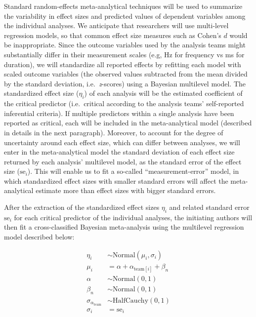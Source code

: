\documentclass[
  english,
  man]{apa6}
\begin{document}
Standard random-effects meta-analytical techniques will be used to summarize the variability in effect sizes and predicted values of dependent variables among the individual analyses.
We anticipate that researchers will use multi-level regression models, so that common effect size measures such as Cohen's \(d\) would be inappropriate.
Since the outcome variables used by the analysis teams might substantially differ in their measurement scales (e.g, Hz for frequency vs ms for duration), we will standardize all reported effects by refitting each model with scaled outcome variables (the observed values subtracted from the mean divided by the standard deviation, i.e.~\emph{z}-scores) using a Bayesian multilevel model.
The standardized effect size (\(\eta_i\)) of each analysis will be the estimated coefficient of the critical predictor (i.e.~critical according to the analysis teams' self-reported inferential criteria).
If multiple predictors within a single analysis have been reported as critical, each will be included in the meta-analytical model (described in details in the next paragraph).
Moreover, to account for the degree of uncertainty around each effect size, which can differ between analyses, we will enter in the meta-analytical model the standard deviation of each effect size returned by each analysis' multilevel model, as the standard error of the effect size (\(\text{se}_i\)).
This will enable us to fit a so-called ``measurement-error'' model, in which standardized effect sizes with smaller standard errors will affect the meta-analytical estimate more than effect sizes with bigger standard errors.

After the extraction of the standardized effect sizes \(\eta_i\) and related standard error \(\text{se}_i\) for each critical predictor of the individual analyses, the initiating authors will then fit a cross-classified Bayesian meta-analysis using the multilevel regression model described below:

\[
\begin{aligned}
\eta_i   & \sim \text{Normal}(\mu_i, \sigma_i) \\
\mu_i     & = \alpha + \alpha_{\text{team}[i]} + \beta_n\\
\alpha  & \sim \text{Normal}(0, 1) \\
\beta_n & \sim \text{Normal}(0, 1) \\
\sigma_{\alpha_{\text{team}}} & \sim \text{HalfCauchy}(0, 1) \\
\sigma_i  & = \text{se}_i
\end{aligned}
\]
\end{document}
